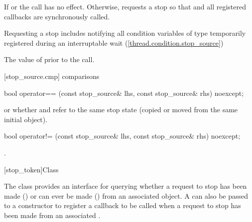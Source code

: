 {\begin{itemdescr}
  \pnum\effects If  or  the call has no effect. 
                Otherwise, requests a stop so that 
                and all registered callbacks are synchronously called.
                \begin{note} Requesting a stop includes notifying all condition variables
                             of type 
                             temporarily registered during an interruptable wait (\ref{thread.condition.stop_source})
                             \end{note}

  \pnum\postconditions {}

  \pnum\returns The value of  prior to the call.
\end{itemdescr}


[stop_source.cmp]{ comparisons}

%
\begin{itemdecl}
bool operator== (const stop_source& lhs, const stop_source& rhs) noexcept;
\end{itemdecl}
\begin{itemdescr}
  \pnum\returns {} or
                whether  and  refer to the
                same stop state
                (copied or moved from the same initial  object).
\end{itemdescr}

%
\begin{itemdecl}
bool operator!= (const stop_source& lhs, const stop_source& rhs) noexcept;
\end{itemdecl}
\begin{itemdescr}
  \pnum\returns {}.
\end{itemdescr}


%
[stop_token]{Class }

\pnum
{}%
The class  provides an interface for querying whether
a request to stop has been made () or can ever be made
() from an associated  object.
A  can also be passed to a  constructor
to register a callback to be called when a request to stop has been made from
an associated . 

}
